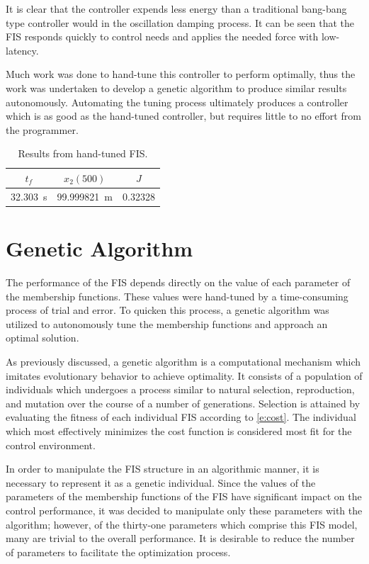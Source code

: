 It is clear that the controller expends less energy than a traditional bang-bang type controller would in the
oscillation damping process. It can be seen that the FIS responds quickly to control needs and applies the
needed force with low-latency. 

Much work was done to hand-tune this controller to perform optimally, thus the work was undertaken to develop
a genetic algorithm to produce similar results autonomously. Automating the tuning process ultimately produces
a controller which is as good as the hand-tuned controller, but requires little to no effort from the
programmer.

\begin{table} \centering \caption{Results from hand-tuned FIS.} \label{tab:finalres} \begin{tabular}{|c|c|c|}
\hline $t_f$ & $x_2(500)$ & $J$ \\ \hline \SI{32.303}{\second} & \SI{99.999821}{\metre} & 0.32328 \\ \hline
\end{tabular} \end{table}

\section{Genetic Algorithm}\label{s:ga} The performance of the FIS depends directly
on the value of each parameter of the membership functions. These values were hand-tuned by a time-consuming
process of trial and error. To quicken this process, a genetic algorithm was utilized to autonomously tune the
membership functions and approach an optimal solution. 

As previously discussed, a genetic algorithm is a computational mechanism which imitates evolutionary behavior
to achieve optimality. It consists of a population of individuals which undergoes a process similar to natural
selection, reproduction, and mutation over the course of a number of generations\cite{cordon:01bk}.  Selection
is attained by evaluating the fitness of each individual FIS according to \cref{e:cost}. The individual which
most effectively minimizes the cost function is considered most fit for the control environment.

In order to manipulate the FIS structure in an algorithmic manner, it is necessary to represent it as a
genetic individual. Since the values of the parameters of the membership functions of the FIS have
significant impact on the control performance, it was decided to manipulate only these parameters with
the algorithm; however, of the thirty-one parameters which comprise this FIS model, many are trivial to
the overall performance. It is desirable to reduce the number of parameters to facilitate the
optimization process.

